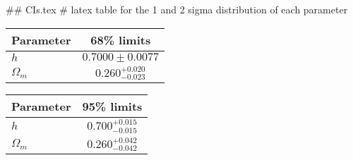 ## CIs.tex
# latex table for the 1 and 2 sigma distribution of each parameter

\begin{tabular} { l  c}
 Parameter &  68\% limits\\
\hline
{\boldmath$h              $} & $0.7000\pm 0.0077          $\\
{\boldmath$\Omega_m       $} & $0.260^{+0.020}_{-0.023}   $\\
\hline
\end{tabular}

\begin{tabular} { l  c}
 Parameter &  95\% limits\\
\hline
{\boldmath$h              $} & $0.700^{+0.015}_{-0.015}   $\\
{\boldmath$\Omega_m       $} & $0.260^{+0.042}_{-0.042}   $\\
\hline
\end{tabular}
